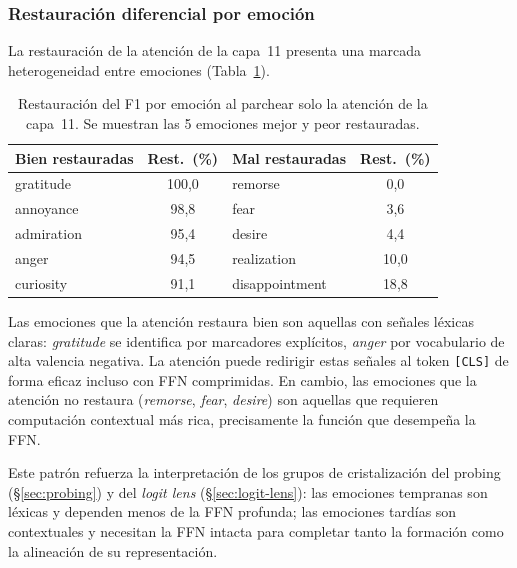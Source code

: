 \subsubsection{Restauración diferencial por emoción}

La restauración de la atención de la capa~11 presenta una marcada
heterogeneidad entre emociones (Tabla~\ref{tab:patching-emociones}).

\begin{table}[ht]
\centering
\caption{Restauración del F1 por emoción al parchear solo la atención
de la capa~11. Se muestran las 5 emociones mejor y peor restauradas.}
\label{tab:patching-emociones}
\begin{tabular}{lclc}
\toprule
\textbf{Bien restauradas} & \textbf{Rest.\ (\%)} &
\textbf{Mal restauradas} & \textbf{Rest.\ (\%)} \\
\midrule
gratitude   & 100{,}0 & remorse        & 0{,}0 \\
annoyance   & 98{,}8  & fear           & 3{,}6 \\
admiration  & 95{,}4  & desire         & 4{,}4 \\
anger       & 94{,}5  & realization    & 10{,}0 \\
curiosity   & 91{,}1  & disappointment & 18{,}8 \\
\bottomrule
\end{tabular}
\end{table}

Las emociones que la atención restaura bien son aquellas con señales
léxicas claras: \emph{gratitude} se identifica por marcadores
explícitos, \emph{anger} por vocabulario de alta valencia negativa. La
atención puede redirigir estas señales al token \texttt{[CLS]} de
forma eficaz incluso con FFN comprimidas. En cambio, las emociones
que la atención no restaura (\emph{remorse}, \emph{fear},
\emph{desire}) son aquellas que requieren computación contextual
más rica, precisamente la función que desempeña la FFN.

Este patrón refuerza la interpretación de los grupos de
cristalización del probing (\S\ref{sec:probing}) y del \emph{logit lens}
(\S\ref{sec:logit-lens}): las emociones tempranas son léxicas y
dependen menos de la FFN profunda; las emociones tardías son
contextuales y necesitan la FFN intacta para completar tanto la
formación como la alineación de su representación.



